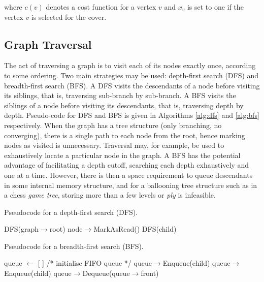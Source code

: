 \documentclass[11pt]{amsart}
\begin{document}
where $c(v)$ denotes a cost function for a vertex $v$ and $x_v$ is set to one if the vertex $v$ is selected for the cover.

\subsection{Graph Traversal}

The act of traversing a graph is to visit each of its nodes exactly once, according to some ordering. Two main strategies may be used: depth-first search (DFS) and breadth-first search (BFS). A DFS visits the descendants of a node before visiting its siblings, that is, traversing sub-branch by sub-branch. A BFS visits the siblings of a node before visiting its descendants, that is, traversing depth by depth. Pseudo-code for DFS and BFS is given in Algorithms \ref{alg:dfs} and \ref{alg:bfs} respectively. When the graph has a tree structure (only branching, no converging), there is a single path to each node from the root, hence marking nodes as visited is unnecessary. Traversal may, for example, be used to exhaustively locate a particular node in the graph. A BFS has the potential advantage of facilitating a depth cutoff, searching each depth exhaustively and one at a time. However, there is then a space requirement to queue descendants in some internal memory structure, and for a ballooning tree structure such as in a chess \emph{game tree}, storing more than a few levels or \emph{ply} is infeasible.

\begin{algorithm}
\caption{Pseudocode for a depth-first search (DFS).}\label{alg:dfs}
\begin{algorithmic}[1]
\State DFS(graph$\rightarrow$root)
\EndProcedure
{}
\State node$\rightarrow$MarkAsRead()
\State DFS(child)
\EndIf
\EndFor
\EndProcedure
\end{algorithmic}
\end{algorithm}

\begin{algorithm}
\caption{Pseudocode for a breadth-first search (BFS).}\label{alg:bfs}
\begin{algorithmic}[1]
\State queue $\leftarrow$ [ ]  \//* initialise FIFO queue *\//
\State queue$\rightarrow$Enqueue(child)
\EndFor
{}
\State queue$\rightarrow$Enqueue(child)
\EndIf
\EndFor
\State queue$\rightarrow$Dequeue(queue$\rightarrow$front)
\EndWhile
\EndProcedure
\end{algorithmic}
\end{algorithm}
\end{document}
